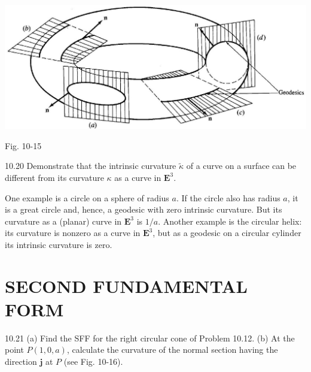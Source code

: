 \documentclass[10pt]{article}
\begin{document}
\begin{center}
\includegraphics[max width=\textwidth]{2024_04_03_41f90be4f896e21f0dc9g-157}
\end{center}

Fig. 10-15

10.20 Demonstrate that the intrinsic curvature $\tilde{\kappa}$ of a curve on a surface can be different from its curvature $\kappa$ as a curve in $\mathbf{E}^{3}$.

One example is a circle on a sphere of radius $a$. If the circle also has radius $a$, it is a great circle and, hence, a geodesic with zero intrinsic curvature. But its curvature as a (planar) curve in $\mathbf{E}^{3}$ is $1 / a$. Another example is the circular helix: its curvature is nonzero as a curve in $\mathbf{E}^{3}$, but as a geodesic on a circular cylinder its intrinsic curvature is zero.

\section*{SECOND FUNDAMENTAL FORM}
10.21 (a) Find the SFF for the right circular cone of Problem 10.12. (b) At the point $P(1,0, a)$, calculate the curvature of the normal section having the direction $\mathbf{j}$ at $P$ (see Fig. 10-16).
\end{document}
